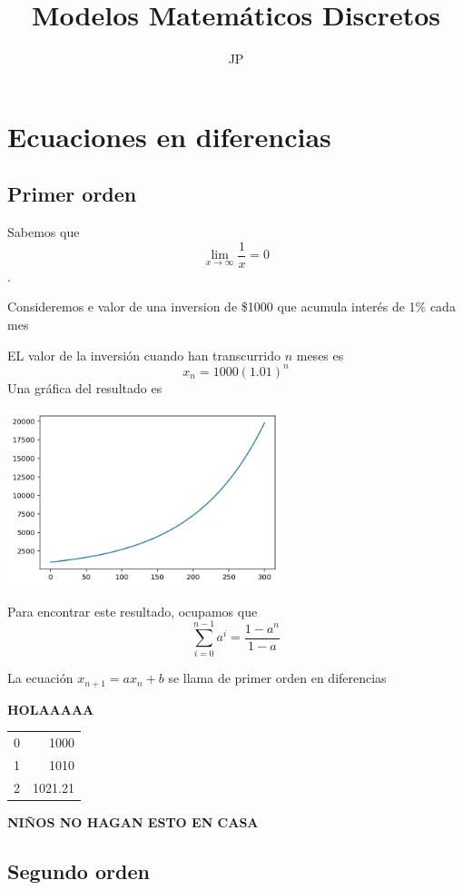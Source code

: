 \documentclass{article}
\title{Modelos Matemáticos Discretos}
\author{JP}
\begin{document}
\maketitle
\section{Ecuaciones en diferencias}
\subsection{Primer orden}

Sabemos que $$\lim_{x\to\infty}\frac{1}{x}=0$$.

Consideremos e valor de una inversion de \$1000 que acumula interés de 1\% cada mes


EL valor de la inversión cuando han transcurrido $n$ meses es $$x_n=1000(1.01)^n$$
Una gráfica del resultado es 

\begin{center}
\includegraphics[width=8cm]{grafica}
\end{center}

Para encontrar este resultado, ocupamos que
$$\sum_{i=0}^{n-1}a^i=\frac{1-a^n}{1-a}$$

La ecuación $x_{n+1}=ax_n+b$ se llama de primer orden en diferencias 

\begin{center}
\huge 
\textbf{HOLAAAAA}
\end{center}

\begin{center}
\begin{tabular}{|c|r|}
\hline
0 & 1000 \\
1 & 1010\\
2 & 1021.21\\
\hline
\end{tabular}
\end{center}

\begin{center}
\huge
\textbf{NIÑOS NO HAGAN ESTO EN CASA}
\end{center}


\subsection{Segundo orden}
\end{document}

